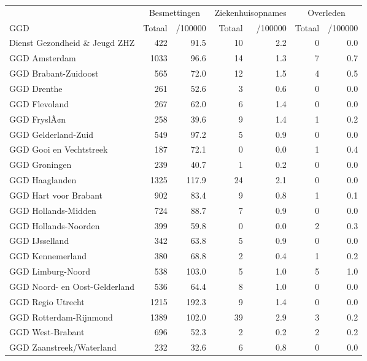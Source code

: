 \documentclass[
  english,
  man,floatsintext]{apa6}
\begin{document}
\begin{table}
\centering\begingroup\fontsize{10}{12}\selectfont

\begin{threeparttable}
\begin{tabular}{lrrrrrr}
\toprule
\multicolumn{1}{c}{ } & \multicolumn{2}{c}{Besmettingen} & \multicolumn{2}{c}{Ziekenhuisopnames} & \multicolumn{2}{c}{Overleden} \\
\cmidrule(l{3pt}r{3pt}){2-3} \cmidrule(l{3pt}r{3pt}){4-5} \cmidrule(l{3pt}r{3pt}){6-7}
GGD & Totaal & /100000 & Totaal & /100000 & Totaal & /100000\\
\midrule
Dienst Gezondheid \& Jeugd ZHZ & 422 & 91.5 & 10 & 2.2 & 0 & 0.0\\
GGD Amsterdam & 1033 & 96.6 & 14 & 1.3 & 7 & 0.7\\
GGD Brabant-Zuidoost & 565 & 72.0 & 12 & 1.5 & 4 & 0.5\\
GGD Drenthe & 261 & 52.6 & 3 & 0.6 & 0 & 0.0\\
GGD Flevoland & 267 & 62.0 & 6 & 1.4 & 0 & 0.0\\
GGD FryslÃ¢n & 258 & 39.6 & 9 & 1.4 & 1 & 0.2\\
GGD Gelderland-Zuid & 549 & 97.2 & 5 & 0.9 & 0 & 0.0\\
GGD Gooi en Vechtstreek & 187 & 72.1 & 0 & 0.0 & 1 & 0.4\\
GGD Groningen & 239 & 40.7 & 1 & 0.2 & 0 & 0.0\\
GGD Haaglanden & 1325 & 117.9 & 24 & 2.1 & 0 & 0.0\\
GGD Hart voor Brabant & 902 & 83.4 & 9 & 0.8 & 1 & 0.1\\
GGD Hollands-Midden & 724 & 88.7 & 7 & 0.9 & 0 & 0.0\\
GGD Hollands-Noorden & 399 & 59.8 & 0 & 0.0 & 2 & 0.3\\
GGD IJsselland & 342 & 63.8 & 5 & 0.9 & 0 & 0.0\\
GGD Kennemerland & 380 & 68.8 & 2 & 0.4 & 1 & 0.2\\
GGD Limburg-Noord & 538 & 103.0 & 5 & 1.0 & 5 & 1.0\\
GGD Noord- en Oost-Gelderland & 536 & 64.4 & 8 & 1.0 & 0 & 0.0\\
GGD Regio Utrecht & 1215 & 192.3 & 9 & 1.4 & 0 & 0.0\\
GGD Rotterdam-Rijnmond & 1389 & 102.0 & 39 & 2.9 & 3 & 0.2\\
GGD West-Brabant & 696 & 52.3 & 2 & 0.2 & 2 & 0.2\\
GGD Zaanstreek/Waterland & 232 & 32.6 & 6 & 0.8 & 0 & 0.0\\

\end{tabular}
\end{threeparttable}
\end{table}
\end{document}
